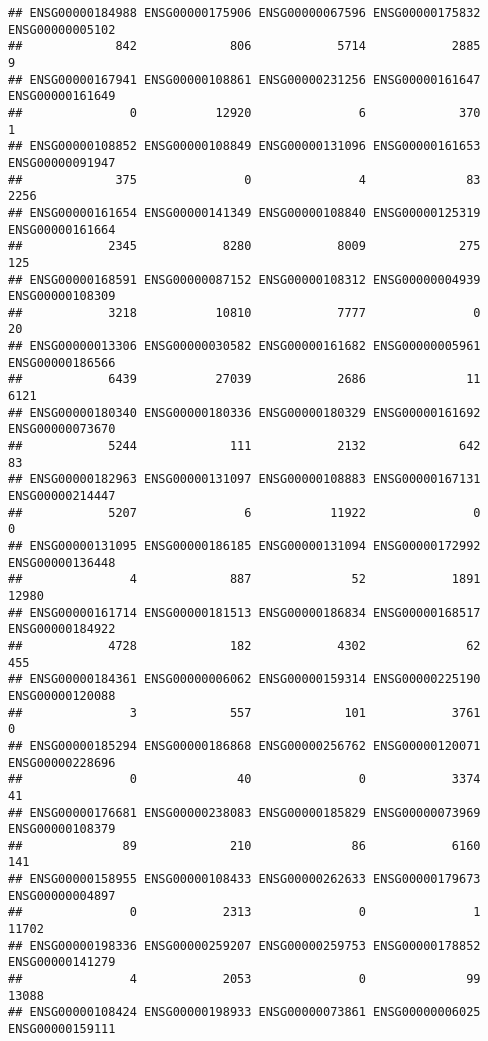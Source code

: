 \documentclass[
]{article}
\begin{document}
\begin{verbatim}
## ENSG00000184988 ENSG00000175906 ENSG00000067596 ENSG00000175832 ENSG00000005102 
##             842             806            5714            2885               9 
## ENSG00000167941 ENSG00000108861 ENSG00000231256 ENSG00000161647 ENSG00000161649 
##               0           12920               6             370               1 
## ENSG00000108852 ENSG00000108849 ENSG00000131096 ENSG00000161653 ENSG00000091947 
##             375               0               4              83            2256 
## ENSG00000161654 ENSG00000141349 ENSG00000108840 ENSG00000125319 ENSG00000161664 
##            2345            8280            8009             275             125 
## ENSG00000168591 ENSG00000087152 ENSG00000108312 ENSG00000004939 ENSG00000108309 
##            3218           10810            7777               0              20 
## ENSG00000013306 ENSG00000030582 ENSG00000161682 ENSG00000005961 ENSG00000186566 
##            6439           27039            2686              11            6121 
## ENSG00000180340 ENSG00000180336 ENSG00000180329 ENSG00000161692 ENSG00000073670 
##            5244             111            2132             642              83 
## ENSG00000182963 ENSG00000131097 ENSG00000108883 ENSG00000167131 ENSG00000214447 
##            5207               6           11922               0               0 
## ENSG00000131095 ENSG00000186185 ENSG00000131094 ENSG00000172992 ENSG00000136448 
##               4             887              52            1891           12980 
## ENSG00000161714 ENSG00000181513 ENSG00000186834 ENSG00000168517 ENSG00000184922 
##            4728             182            4302              62             455 
## ENSG00000184361 ENSG00000006062 ENSG00000159314 ENSG00000225190 ENSG00000120088 
##               3             557             101            3761               0 
## ENSG00000185294 ENSG00000186868 ENSG00000256762 ENSG00000120071 ENSG00000228696 
##               0              40               0            3374              41 
## ENSG00000176681 ENSG00000238083 ENSG00000185829 ENSG00000073969 ENSG00000108379 
##              89             210              86            6160             141 
## ENSG00000158955 ENSG00000108433 ENSG00000262633 ENSG00000179673 ENSG00000004897 
##               0            2313               0               1           11702 
## ENSG00000198336 ENSG00000259207 ENSG00000259753 ENSG00000178852 ENSG00000141279 
##               4            2053               0              99           13088 
## ENSG00000108424 ENSG00000198933 ENSG00000073861 ENSG00000006025 ENSG00000159111 

\end{verbatim}
\end{document}
